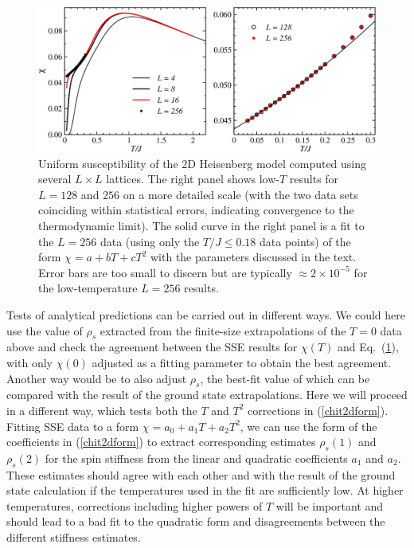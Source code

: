 \documentclass[draft,numberedheadings]{aipproc}
\begin{document}
\begin{figure}
\includegraphics[width=13cm, clip]{hbsus2d.eps}
\caption{Uniform susceptibility of the 2D Heisenberg model computed using several $L \times L$ lattices. The right panel shows low-$T$ results for 
$L=128$ and $256$ on a more detailed scale (with the two data sets coinciding within statistical errors, indicating convergence to the thermodynamic limit).
The solid curve in the right panel is a fit to the $L=256$ data (using only the $T/J \le 0.18$ data points) of the form $\chi=a+bT+cT^2$ with the parameters 
discussed in the text. Error bars are too small to discern but are typically $\approx 2\times 10^{-5}$ for the low-temperature $L=256$ results.}
\label{hbsus2d}
\end{figure}

Tests of analytical predictions can be carried out in different ways. We could here use the value of $\rho_s$ extracted from the finite-size extrapolations 
of the $T=0$ data above and check the agreement between the SSE results for $\chi(T)$ and Eq.~(\ref{hbsus2d}), with only $\chi(0)$ adjusted as a fitting 
parameter to obtain the best agreement. Another way would be to also adjust $\rho_s$, the best-fit value of which can be compared with the 
result of the ground state extrapolations. Here we will proceed in a different way, which tests both the $T$ and $T^2$ corrections in (\ref{chit2dform}). 
Fitting SSE data to a form $\chi=a_0+a_1T+a_2T^2$, we can use the form of the coefficients in (\ref{chit2dform}) to extract corresponding estimates 
$\rho_s(1)$ and $\rho_s(2)$ for the spin stiffness from the linear and quadratic coefficients $a_1$ and $a_2$. These estimates should agree with each 
other and with the result of the ground state calculation if the temperatures used in the fit are sufficiently low. At higher temperatures, corrections 
including higher powers of $T$ will be important and should lead to a bad fit to the quadratic form and disagreements between the different stiffness 
estimates. 
\end{document}
